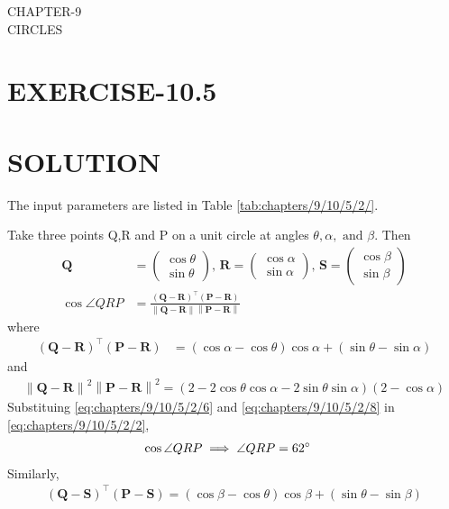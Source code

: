 \documentclass[12pt]{article}
\providecommand{\brak}[1]{\ensuremath{\left(#1\right)}}
\providecommand{\norm}[1]{\left\lVert#1\right\rVert}
\newcommand{\myvec}[1]{\ensuremath{\begin{pmatrix}#1\end{pmatrix}}}
\let\vec\mathbf
\begin{document}
\begin{center}
\textbf\large{CHAPTER-9 \\ CIRCLES}

\end{center}
\begin{enumerate}
\section{EXERCISE-10.5}
\section{SOLUTION}
\fi
The input parameters are listed in Table
\ref{tab:chapters/9/10/5/2/}.	
\begin{table}[H]
	
\caption{}
\label{tab:chapters/9/10/5/2/}	
\end{table}
Take three points Q,R and P on a unit circle  at angles $\theta,\alpha,\text{ and }\beta$. Then
\begin{align}
	\vec{Q} &= \myvec{\cos\theta\\ \sin\theta},\,
	\vec{R} = \myvec{\cos\alpha\\ \sin\alpha},\,
	\vec{S} = \myvec{\cos\beta\\ \sin\beta}
	\\
	\cos\angle QRP&= \frac{\brak{\vec{Q}-\vec{R}}^{\top}\brak{\vec{P}-\vec{R}}}{\norm{\vec{Q}-\vec{R}}\norm{\vec{P}-\vec{R}}}\label{eq:chapters/9/10/5/2/2}
\end{align}
where
\begin{align}
\brak{\vec{Q}-\vec{R}}^{\top}\brak{\vec{P}-\vec{R}}&= \brak{\cos\alpha-\cos\theta}\cos\alpha+\brak{\sin\theta-\sin\alpha}\label{eq:chapters/9/10/5/2/6}
\end{align}
and 
\begin{align}
\norm{\vec{Q}-\vec{R}}^2\norm{\vec{P}-\vec{R}}^2 =\brak{2-2\cos\theta\cos\alpha-2\sin\theta\sin\alpha}\brak{2-\cos\alpha}\label{eq:chapters/9/10/5/2/8}
\end{align}
Substituing \eqref{eq:chapters/9/10/5/2/6} and \eqref{eq:chapters/9/10/5/2/8} in \eqref{eq:chapters/9/10/5/2/2},
\begin{align}
\cos\angle QRP \implies \angle QRP&=62\degree
\end{align}
Similarly, 
\begin{align}
\brak{\vec{Q}-\vec{S}}^{\top}\brak{\vec{P}-\vec{S}}=\brak{\cos\beta-\cos\theta}\cos\beta+\brak{\sin\theta-\sin\beta}\label{eq:chapters/9/10/5/2/16}
\end{align}

\end{enumerate}
\end{document}
